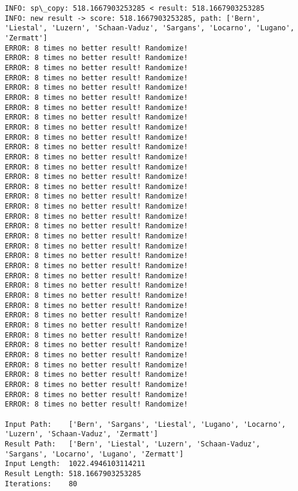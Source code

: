 \documentclass[11pt]{article}
\begin{document}
\begin{Verbatim}[commandchars=\\\{\}]
INFO: sp\_copy: 518.1667903253285 < result: 518.1667903253285
INFO: new result -> score: 518.1667903253285, path: ['Bern', 'Liestal', 'Luzern', 'Schaan-Vaduz', 'Sargans', 'Locarno', 'Lugano', 'Zermatt']
ERROR: 8 times no better result! Randomize!
ERROR: 8 times no better result! Randomize!
ERROR: 8 times no better result! Randomize!
ERROR: 8 times no better result! Randomize!
ERROR: 8 times no better result! Randomize!
ERROR: 8 times no better result! Randomize!
ERROR: 8 times no better result! Randomize!
ERROR: 8 times no better result! Randomize!
ERROR: 8 times no better result! Randomize!
ERROR: 8 times no better result! Randomize!
ERROR: 8 times no better result! Randomize!
ERROR: 8 times no better result! Randomize!
ERROR: 8 times no better result! Randomize!
ERROR: 8 times no better result! Randomize!
ERROR: 8 times no better result! Randomize!
ERROR: 8 times no better result! Randomize!
ERROR: 8 times no better result! Randomize!
ERROR: 8 times no better result! Randomize!
ERROR: 8 times no better result! Randomize!
ERROR: 8 times no better result! Randomize!
ERROR: 8 times no better result! Randomize!
ERROR: 8 times no better result! Randomize!
ERROR: 8 times no better result! Randomize!
ERROR: 8 times no better result! Randomize!
ERROR: 8 times no better result! Randomize!
ERROR: 8 times no better result! Randomize!
ERROR: 8 times no better result! Randomize!
ERROR: 8 times no better result! Randomize!
ERROR: 8 times no better result! Randomize!
ERROR: 8 times no better result! Randomize!
ERROR: 8 times no better result! Randomize!
ERROR: 8 times no better result! Randomize!
ERROR: 8 times no better result! Randomize!
ERROR: 8 times no better result! Randomize!
ERROR: 8 times no better result! Randomize!
ERROR: 8 times no better result! Randomize!
ERROR: 8 times no better result! Randomize!

Input Path:    ['Bern', 'Sargans', 'Liestal', 'Lugano', 'Locarno', 'Luzern', 'Schaan-Vaduz', 'Zermatt']
Result Path:   ['Bern', 'Liestal', 'Luzern', 'Schaan-Vaduz', 'Sargans', 'Locarno', 'Lugano', 'Zermatt']
Input Length:  1022.4946103114211
Result Length: 518.1667903253285
Iterations:    80

    \end{Verbatim}

    \begin{center}
    \end{center}
    { \hspace*{\fill} \\}
    
\end{document}
